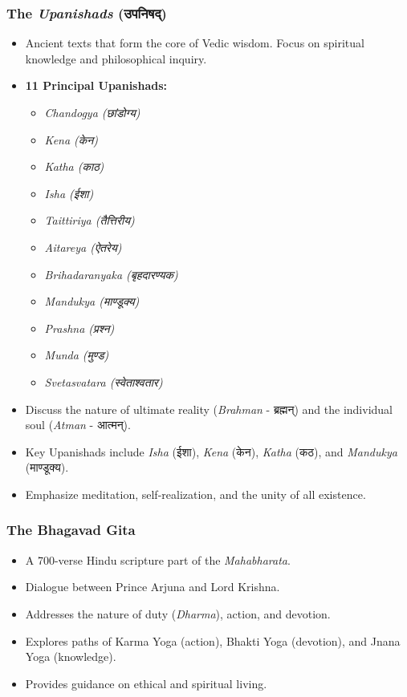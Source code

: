 \begin{frame}[fragile]\frametitle{The \textit{Upanishads} (उपनिषद्)}

      \begin{itemize}
		\item Ancient texts that form the core of Vedic wisdom. Focus on spiritual knowledge and philosophical inquiry.
        \item \textbf{11 Principal Upanishads:}
        \begin{itemize}
            \item \textit{Chandogya (छांडोग्य)} 
            \item \textit{Kena (केन)}
            \item \textit{Katha (काठ)}
            \item \textit{Isha (ईशा)}
            \item \textit{Taittiriya (तैत्तिरीय)}
            \item \textit{Aitareya (ऐतरेय)}
            \item \textit{Brihadaranyaka (बृहदारण्यक)}
            \item \textit{Mandukya (माण्डूक्य)}
            \item \textit{Prashna (प्रश्न)}
            \item \textit{Munda (मुण्ड)}
            \item \textit{Svetasvatara (स्वेताश्वतार)}
        \end{itemize}		
		\item Discuss the nature of ultimate reality (\textit{Brahman} - ब्रह्मन्) and the individual soul (\textit{Atman} - आत्मन्).
		\item Key Upanishads include \textit{Isha} (ईशा), \textit{Kena} (केन), \textit{Katha} (कठ), and \textit{Mandukya} (माण्डूक्य).
		\item Emphasize meditation, self-realization, and the unity of all existence.
	  \end{itemize}

\end{frame}


\begin{frame}[fragile]\frametitle{The Bhagavad Gita}

      \begin{itemize}
		\item A 700-verse Hindu scripture part of the \textit{Mahabharata}.
		\item Dialogue between Prince Arjuna and Lord Krishna.
		\item Addresses the nature of duty (\textit{Dharma}), action, and devotion.
		\item Explores paths of Karma Yoga (action), Bhakti Yoga (devotion), and Jnana Yoga (knowledge).
		\item Provides guidance on ethical and spiritual living.
	  \end{itemize}

\end{frame}

